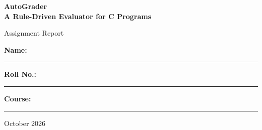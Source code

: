 \documentclass[11pt,a4paper]{article}
\begin{document}
\begin{titlepage}
\centering
\vspace*{3cm}
{\LARGE\bfseries AutoGrader\\[6pt] A Rule-Driven Evaluator for C Programs\par}
\vspace{1cm}
{\large Assignment Report\par}
\vspace{2.5cm}
{\large \textbf{Name:} \rule{6cm}{0.4pt}\par}
\vspace{0.6cm}
{\large \textbf{Roll No.:} \rule{5.4cm}{0.4pt}\par}
\vspace{0.6cm}
{\large \textbf{Course:} \rule{5.6cm}{0.4pt}\par}
\vfill
{\large October 2026\par}
\end{titlepage}

\begin{abstract}
\noindent
This report presents AutoGrader, an agent that grades student C programs without human intervention. Given a
submission and an instructor-written rules file, it compiles and runs the program in a sandbox with fixed time and
memory limits, evaluates nine metrics with independent analyzers (correctness, compiler warnings, structure,
modularity, corner cases, time complexity, memory safety, readability and originality) and combines them into one
weighted grade. For an incorrect program the feedback gives a concrete failing input with the expected output, the
sanitizer diagnosis and an explanation. Readability is judged by an LLM on Groq, and a local Ollama
\texttt{qwen3:4b} model proposes adversarial inputs, explains failures and writes reference solutions so that copying
from an LLM can be detected. Originality is measured on an abstract structural representation of the code that
ignores renaming, formatting and loop style. The system has a Django backend and a plain HTML/CSS frontend and runs on
macOS and Linux. On ten sample submissions, each with a known flaw, the agent detected every flaw, and repeated grading
on both platforms produced identical grades, metric scores and flags.
\end{abstract}

\tableofcontents
\newpage

\end{document}
